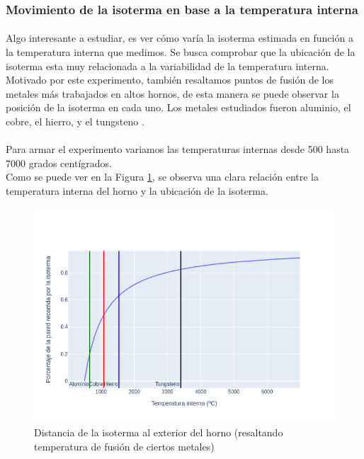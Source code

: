 \documentclass[12pt]{article}
\begin{document}
\subsubsection{Movimiento de la isoterma en base a la temperatura interna}

\paragraph{} Algo interesante a estudiar, es ver cómo varía la isoterma estimada en función a la temperatura interna que medimos. Se busca comprobar que la ubicación de la isoterma esta muy relacionada a la variabilidad de la temperatura interna. Motivado por este experimento, también resaltamos puntos de fusión de los metales más trabajados en altos hornos, de esta manera se puede observar la posición de la isoterma en cada uno. Los metales estudiados fueron aluminio, el cobre, el hierro, y el tungsteno \cite{big:metales}. 
\paragraph{} Para armar el experimento variamos las temperaturas internas desde 500 hasta 7000 grados centígrados. \\
Como se puede ver en la Figura \ref{fig:isotherm_by_inner_metals}, se observa una clara relación entre la temperatura interna del horno y la ubicación de la isoterma. 

\begin{figure}[H]
  \centering
  \includegraphics[scale=0.5]{isotherm_by_inner_metals}
  \caption{Distancia de la isoterma al exterior del horno (resaltando temperatura de fusión de ciertos metales)}
  \label{fig:isotherm_by_inner_metals}
\end{figure}
\end{document}
